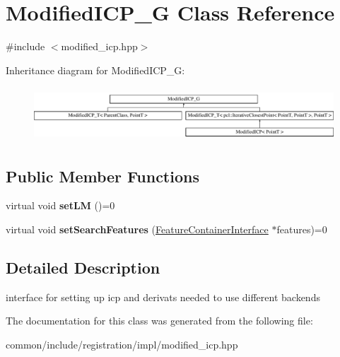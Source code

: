 \hypertarget{classModifiedICP__G}{
\section{ModifiedICP\_\-G Class Reference}
\label{classModifiedICP__G}
}


{\ttfamily \#include $<$modified\_\-icp.hpp$>$}

Inheritance diagram for ModifiedICP\_\-G:\begin{figure}[H]
\begin{center}
\leavevmode
\includegraphics[height=2.043796cm]{classModifiedICP__G}
\end{center}
\end{figure}
\subsection*{Public Member Functions}
\begin{DoxyCompactItemize}
\item 
\hypertarget{classModifiedICP__G_ae519935eb1eb99432cef5f5b9d222758}{
virtual void {\bfseries setLM} ()=0}
\label{classModifiedICP__G_ae519935eb1eb99432cef5f5b9d222758}

\item 
\hypertarget{classModifiedICP__G_a02cec78304467b3babd3d096f634d722}{
virtual void {\bfseries setSearchFeatures} (\hyperlink{classFeatureContainerInterface}{FeatureContainerInterface} $\ast$features)=0}
\label{classModifiedICP__G_a02cec78304467b3babd3d096f634d722}

\end{DoxyCompactItemize}


\subsection{Detailed Description}
interface for setting up icp and derivats needed to use different backends 

The documentation for this class was generated from the following file:\begin{DoxyCompactItemize}
\item 
common/include/registration/impl/modified\_\-icp.hpp\end{DoxyCompactItemize}
